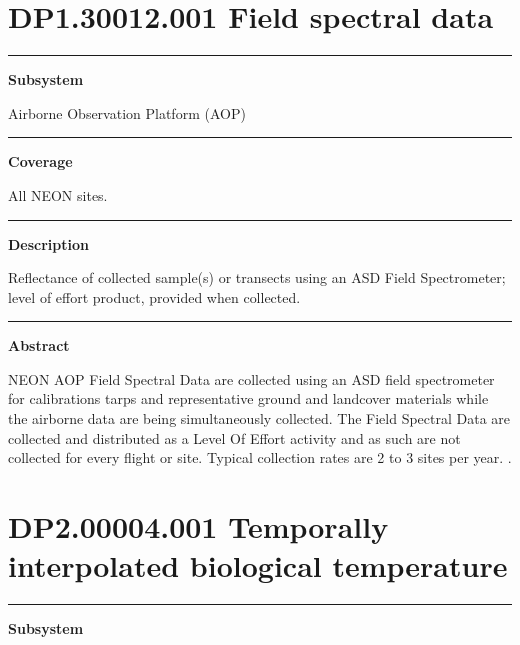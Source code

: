 \documentclass[]{article}
\begin{document}
\section{DP1.30012.001 Field spectral
data}\label{dp1.30012.001-field-spectral-data}

\begin{center}\rule{0.5\linewidth}{\linethickness}\end{center}

\textbf{Subsystem}

Airborne Observation Platform (AOP)

\begin{center}\rule{0.5\linewidth}{\linethickness}\end{center}

\textbf{Coverage}

All NEON sites.

\begin{center}\rule{0.5\linewidth}{\linethickness}\end{center}

\textbf{Description}

Reflectance of collected sample(s) or transects using an ASD Field
Spectrometer; level of effort product, provided when collected.

\begin{center}\rule{0.5\linewidth}{\linethickness}\end{center}

\textbf{Abstract}

NEON AOP Field Spectral Data are collected using an ASD field
spectrometer for calibrations tarps and representative ground and
landcover materials while the airborne data are being simultaneously
collected. The Field Spectral Data are collected and distributed as a
Level Of Effort activity and as such are not collected for every flight
or site. Typical collection rates are 2 to 3 sites per year. \newpage
.

\section{DP2.00004.001 Temporally interpolated biological
temperature}\label{dp2.00004.001-temporally-interpolated-biological-temperature}

\begin{center}\rule{0.5\linewidth}{\linethickness}\end{center}

\textbf{Subsystem}
\end{document}
